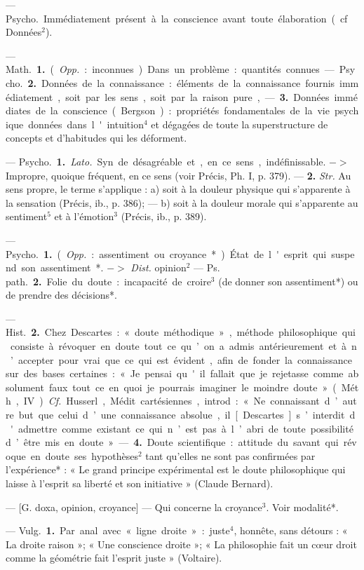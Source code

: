\begin{itemize}[leftmargin=1cm, label=, itemsep=1pt]
 — \si{Psycho.} Immédiatement
présent à la conscience avant toute
élaboration (cf. Données$^2$).

 — \si{Math.} {\bf 1.} ({\it Opp.} : inconnues). Dans un problème : quantités
connues.

— \si{Psycho.} {\bf 2.} Données de la connaissance : éléments de la connaissance fournis immédiatement, soit
par les sens, soit par la raison pure,
— {\bf 3.} Données immédiates de la conscience (Bergson) : propriétés fondamentales de la vie psychique données dans l'intuition$^4$ et dégagées de
toute la superstructure de concepts
et d’habitudes qui les déforment.

 — \si{Psycho.} {\bf 1.} {\it Lato.} Syn. de
désagréable et, en ce sens, indéfinissable. $->$ Impropre, quoique fréquent, en ce sens (voir Précis, Ph. I,
p. 379). — {\bf 2.} {\it Str.} Au sens propre,
le terme s’applique : a) soit à la douleur physique qui s'apparente à la
sensation (Précis, ib., p. 386); —
b) soit à la douleur morale qui s’apparente au sentiment$^5$ et à l’émotion$^3$
(Précis, ib., p. 389).

 — \si{Psycho.} {\bf 1.} ({\it Opp.} :
assentiment ou croyance*). État de l'esprit
qui suspend son assentiment*.
$->$ {\it Dist.} opinion$^2$ — \si{Ps. path.}
 {\bf 2.} Folie du doute : incapacité de
croire$^3$ (de donner son assentiment*)
ou de prendre des décisions*.

— \si{Hist.} {\bf 2.} Chez Descartes : « doute
méthodique », méthode philosophique qui consiste à révoquer en
doute tout ce qu’on a admis antérieurement et à n’accepter pour vrai
que ce qui est évident, afin de fonder
la connaissance sur des bases certaines : « Je pensai qu'il fallait que
je rejetasse comme absolument faux
tout ce en quoi je pourrais imaginer
le moindre doute » (Méth., IV). {\it Cf.}
Husserl, Médit. cartésiennes, introd. :
« Ne connaissant d’autre but que
celui d’une connaissance absolue,
il [Descartes] s’interdit d'admettre
comme existant ce qui n’est pas à
l’abri de toute possibilité d’être mis
en doute ». — {\bf 4.} Doute scientifique :
attitude du savant qui révoque en
doute ses hypothèses$^2$ tant qu’elles
ne sont pas confirmées par l’expérience* : « Le grand principe expérimental est le doute philosophique
qui laisse à l’esprit sa liberté et son
initiative » (Claude Bernard).

 — [G. doxa, opinion, croyance]
— Qui concerne la croyance$^3$. Voir
modalité*.

 — \si{Vulg.} {\bf 1.} Par anal. avec
« ligne droite » : juste$^4$, honnête, sans
détours : « La droite raison »; « Une
conscience droite »; « La philosophie
fait un cœur droit comme la géométrie fait l'esprit juste » (Voltaire).


\end{itemize}
